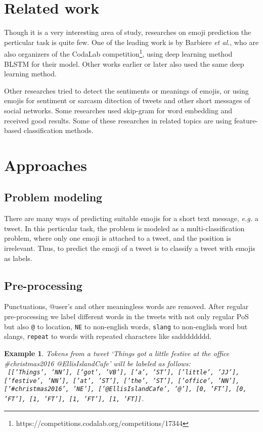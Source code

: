 \documentclass[english, table, latin9]{article}
\newtheorem{example}{Example}
\begin{document}
\section{Related work}
\label{sc2}
Though it is a very interesting area of study, researches on emoji prediction the perticular task is quite few. One of the leading work is by Barbiere \emph{et al.}, who are also organizers of the CodaLab competition\footnote{https://competitions.codalab.org/competitions/17344}, using deep learning method BLSTM for their model. Other works earlier or later also used the same deep learning method. 
\par Other researches tried to detect the sentiments or meanings of emojis\cite{bib9}, or using emojis for sentiment or sarcasm ditection of tweets and other short messages of social networks\cite{bib14, bib12}. Some researches used skip-gram for word embedding and received good results\cite{bib9}. Some of these researches in related topics are using feature-based classification methods\cite{bib13, bib14}.

\section{Approaches}
\label{sc3}
\subsection{Problem modeling}
\label{sc31}
There are many ways of predicting suitable emojis for a short text message, \emph{e.g.} a tweet. In this perticular task, the problem is modeled as a multi-classification problem, where only one emoji is attached to a tweet, and the position is irrelevant. Thus, to predict the emoji of a tweet is to classify a tweet with emojis as labels.

\subsection{Pre-processing}
\label{sc32}
Punctuations, @user's and other meaningless words are removed.
After regular pre-processing we label different words in the tweets with not only regular PoS but also \texttt{@} to location, \texttt{NE} to non-english words, \texttt{slang} to non-english word but slangs, \texttt{repeat} to words with repeated characters like sadddddddd. 

\begin{example}
Tokens from a tweet \textnormal{`Things got a little festive at the office \#christmas2016 @EllisIslandCafe'} will be labeled as follows: \\\textnormal{\texttt{
[['Things', 'NN'], ['got', 'VB'], ['a', 'ST'], ['little', 'JJ'], ['festive', 'NN'], ['at', 'ST'], ['the', 'ST'], ['office', 'NN'], ['\#christmas2016', 'NE'], ['@EllisIslandCafe', '@'], [0, 'FT'], [0, 'FT'], [1, 'FT'], [1, 'FT'], [1, 'FT]]}}.
\end{example}
\end{document}
